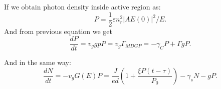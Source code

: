 If we obtain photon density inside active region as:
\begin{equation*}
	P = \frac{1}{2} \varepsilon n_r^2 |A E(0)|^2/E.
\end{equation*}
And from previous equation we get
\begin{equation}
	\frac{d P}{d t} = v_g g pP = v_g \Gamma_{MD G P} = - \gamma_C P + \Gamma g P.
\end{equation}

And in the same way:
\begin{equation}
	\frac{d N}{d t} = - v_g G(E) P =  \frac{J}{ed} \left(
	1 + \frac{\xi P (t- \tau)}{P_0}
\right) - \gamma_s N - g P.
\end{equation}